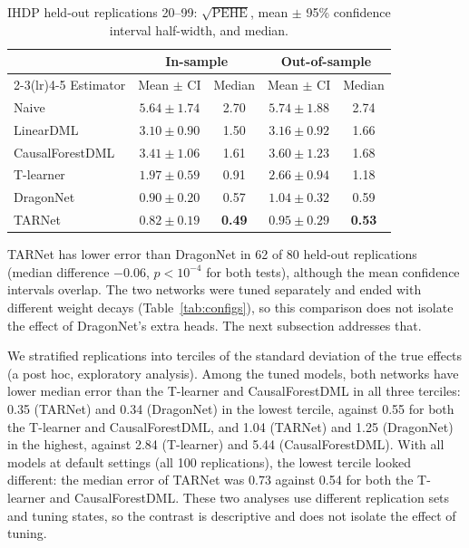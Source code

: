 \documentclass[10pt]{article}
\begin{document}
\begin{table}[t]
\centering
\small
\caption{IHDP held-out replications 20--99: $\sqrt{\mathrm{PEHE}}$, mean $\pm$ 95\% confidence interval half-width, and median.}
\label{tab:ihdp}
\begin{tabular}{lcccc}
\toprule
 & \multicolumn{2}{c}{In-sample} & \multicolumn{2}{c}{Out-of-sample} \\
\cmidrule(lr){2-3}\cmidrule(lr){4-5}
Estimator & Mean $\pm$ CI & Median & Mean $\pm$ CI & Median \\
\midrule
Naive & $5.64 \pm 1.74$ & 2.70 & $5.74 \pm 1.88$ & 2.74 \\
LinearDML & $3.10 \pm 0.90$ & 1.50 & $3.16 \pm 0.92$ & 1.66 \\
CausalForestDML & $3.41 \pm 1.06$ & 1.61 & $3.60 \pm 1.23$ & 1.68 \\
T-learner & $1.97 \pm 0.59$ & 0.91 & $2.66 \pm 0.94$ & 1.18 \\
DragonNet & $0.90 \pm 0.20$ & 0.57 & $1.04 \pm 0.32$ & 0.59 \\
TARNet & $\mathbf{0.82 \pm 0.19}$ & \textbf{0.49} & $\mathbf{0.95 \pm 0.29}$ & \textbf{0.53} \\
\bottomrule
\end{tabular}
\end{table}

TARNet has lower error than DragonNet in 62 of 80 held-out replications (median difference $-0.06$, $p<10^{-4}$ for both tests), although the mean confidence intervals overlap. The two networks were tuned separately and ended with different weight decays (Table~\ref{tab:configs}), so this comparison does not isolate the effect of DragonNet's extra heads. The next subsection addresses that.

We stratified replications into terciles of the standard deviation of the true effects (a post hoc, exploratory analysis). Among the tuned models, both networks have lower median error than the T-learner and CausalForestDML in all three terciles: 0.35 (TARNet) and 0.34 (DragonNet) in the lowest tercile, against 0.55 for both the T-learner and CausalForestDML, and 1.04 (TARNet) and 1.25 (DragonNet) in the highest, against 2.84 (T-learner) and 5.44 (CausalForestDML). With all models at default settings (all 100 replications), the lowest tercile looked different: the median error of TARNet was 0.73 against 0.54 for both the T-learner and CausalForestDML. These two analyses use different replication sets and tuning states, so the contrast is descriptive and does not isolate the effect of tuning.
\end{document}
